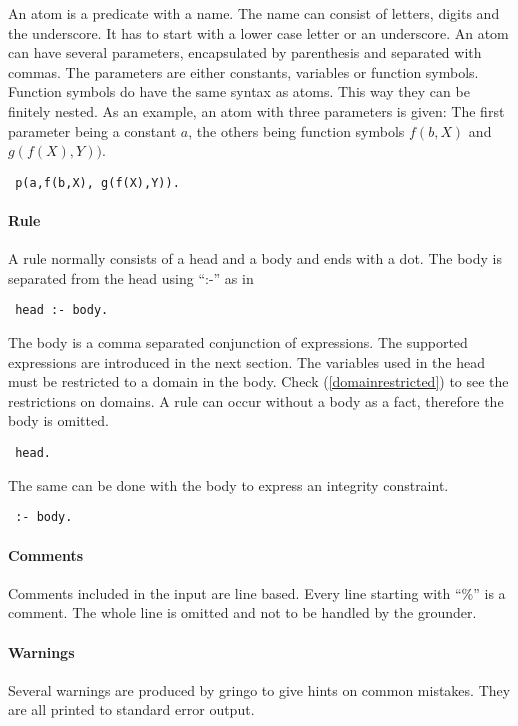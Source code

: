 \documentclass[a4paper,10pt]{article}
\begin{document}
An atom is a predicate with a name. The name can consist of letters, digits and the underscore.
It has to start with a lower case letter or an underscore.
An atom can have several parameters, encapsulated by parenthesis and separated with commas.
The parameters are either constants, variables or function symbols.
Function symbols do have the same syntax as atoms. This way they can be finitely nested.
As an example, an atom with three parameters is given:
The first parameter being a constant $a$, the others being function symbols $f(b,X)$ and $g(f(X), Y))$.
\begin{verbatim}
 p(a,f(b,X), g(f(X),Y)).
\end{verbatim}

\paragraph{Rule}
A rule normally consists of a head and a body and ends with a dot.
The body is separated from the head using ``:-'' as in
\begin{verbatim}
 head :- body.
\end{verbatim}
The body is a comma separated conjunction of expressions.
The supported expressions are introduced in the next section.
The variables used in the head must be restricted to a domain in the body.
Check (\ref{domainrestricted}) to see the restrictions on domains.
\newline
A rule can occur without a body as a fact, therefore the body is omitted.
\begin{verbatim}
 head.
\end{verbatim}
The same can be done with the body to express an integrity constraint.
\begin{verbatim}
 :- body.
\end{verbatim}

\paragraph{Comments}
Comments included in the input are line based.
Every line starting with ``\%'' is a comment. The whole line is omitted and not to be handled by the grounder.
\paragraph{Warnings}
Several warnings are produced by gringo to give hints on common mistakes.
They are all printed to standard error output.
\end{document}

